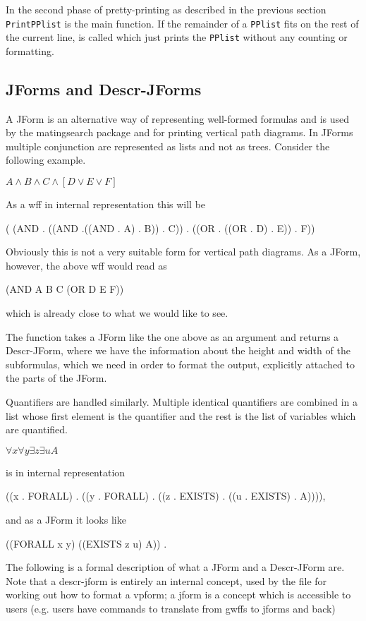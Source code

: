 In the second phase of pretty-printing as described in the previous section
{\tt PrintPPlist} is the main function.  If the remainder of a {\tt PPlist} fits
on the rest of the current line,  is called which just 
prints the {\tt PPlist} without any counting or formatting.

\subsection{JForms and Descr-JForms}

A JForm is an alternative way of representing well-formed formulas and
is used by the matingsearch package and for printing vertical path
diagrams. In JForms multiple conjunction are represented as lists and
not as trees. Consider the following example.
\begin{Example}
$A \land B \land C \land [D \lor E \lor F]$
\end{Example}
As a wff in internal representation this will be
\begin{Example}
( (AND . ((AND .((AND . A) . B)) . C))
  . ((OR . ((OR . D) . E)) . F))
\end{Example}
Obviously this is not a very suitable form for vertical path
diagrams.  As a JForm, however, the above wff would read as 
\begin{Example}
(AND A B C (OR D E F))
\end{Example}
which is already close to what we would like to see.

The function  takes a JForm like the one
above as an argument and returns a Descr-JForm, where we have the
information about the height and width of the subformulas, which we
need in order to format the output, explicitly attached to the parts of
the JForm.

Quantifiers are handled similarly. Multiple identical quantifiers
are combined in a list whose first element is the quantifier and the
rest is the list of variables which are quantified.
\begin{Example}
$\forall x \forall y \exists z \exists u A$
\end{Example}
is in internal representation
\begin{Example}
((x . FORALL) . ((y . FORALL)
       . ((z . EXISTS) . ((u . EXISTS) . A)))),
\end{Example}
and as a JForm it looks like
\begin{Example}
((FORALL x y) ((EXISTS z u) A)) .
\end{Example}
The following is a formal description of what a JForm and a Descr-JForm
are. Note that a descr-jform is entirely an internal concept, used by the
file  for working out how to format a vpform; a 
jform is a concept which is accessible to users (e.g. users have commands
to translate from gwffs to jforms and back)

